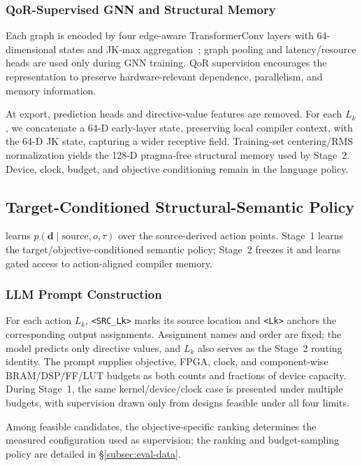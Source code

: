 \subsubsection{QoR-Supervised GNN and Structural Memory}
\label{subsubsec:gnn-backbone}

Each graph is encoded by four edge-aware TransformerConv layers with 64-dimensional states and JK-max aggregation~\cite{xu2018jumping};
graph pooling and latency/resource heads are used only during GNN training. QoR supervision encourages the representation to preserve hardware-relevant dependence, parallelism, and memory information.

At export, prediction heads and directive-value features are removed.
For each $L_k$, we concatenate a 64-D early-layer state, preserving local compiler context, with the 64-D JK state, capturing a wider receptive field. Training-set centering/RMS normalization yields the 128-D pragma-free structural memory used by Stage~2. Device, clock, budget, and objective conditioning remain in the language policy.




\subsection{Target-Conditioned Structural-Semantic Policy}
\label{subsec:llm-backbone}

\framework learns $p(\mathbf d\mid\text{source},o,\tau)$ over the source-derived action points. Stage~1 learns the target/objective-conditioned semantic policy; Stage~2 freezes it and learns gated access to action-aligned compiler memory.


\subsubsection{LLM Prompt Construction}
\label{subsubsec:prompt}

For each action $L_k$, \texttt{<SRC\_Lk>} marks its source location and \texttt{<Lk>} anchors the corresponding output assignments.
Assignment names and order are fixed; the model predicts only directive values, and $L_k$ also serves as the Stage~2 routing identity.
The prompt supplies objective, FPGA, clock, and component-wise BRAM/DSP/FF/LUT budgets as both counts and fractions of device capacity. During Stage~1, the same kernel/device/clock case is presented under multiple budgets, with supervision drawn only from
designs feasible under all four limits.

Among feasible candidates, the objective-specific ranking determines the measured configuration used as supervision; the ranking and budget-sampling policy are detailed in \S\ref{subsec:eval-data}.



